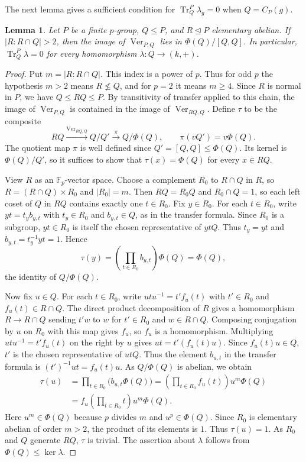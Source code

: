 \documentclass[11pt,a4paper]{article}
\newtheorem{lemma}[theorem]{Lemma}
\theoremstyle{definition}
\theoremstyle{remark}
\numberwithin{equation}{section}
\newcommand{\Fp}{\mathbb{F}_p}
\begin{document}
	The next lemma gives a sufficient condition for
	$\operatorname{Tr}_{Q}^P\lambda_g=0$ when $Q=C_P(g)$.
	
	\begin{lemma}\label{lem:elementary-transfer}
		Let $P$ be a finite $p$-group, $Q\le P$, and $R\unlhd P$ elementary abelian.
		If $|R:R\cap Q|>2$, then the image of $\operatorname{Ver}_{P,Q}$
		lies in $\Phi(Q)/[Q,Q]$. In particular, $\operatorname{Tr}_{Q}^P\lambda=0$
		for every homomorphism $\lambda:Q\to(k,+)$.
	\end{lemma}
	
	\begin{proof}
		Put $m=|R:R\cap Q|$. This index is a power of $p$. Thus for odd $p$
		the hypothesis $m>2$ means $R\nleq Q$, and for $p=2$ it means $m\ge4$.
		Since $R$ is normal in $P$, we have $Q\le RQ\le P$. By transitivity
		of transfer \cite[Theorem~10.8]{Isaacs2008} applied to this chain,
		the image of $\operatorname{Ver}_{P,Q}$ is contained in the image of
		$\operatorname{Ver}_{RQ,Q}$. Define $\tau$ to be the composite
		\[
		RQ\xrightarrow{\operatorname{Ver}_{RQ,Q}} Q/Q'
		\xrightarrow{\pi} Q/\Phi(Q),
		\qquad \pi(vQ')=v\Phi(Q).
		\]
		The quotient map $\pi$ is well defined since $Q'=[Q,Q]\le\Phi(Q)$.
		Its kernel is $\Phi(Q)/Q'$, so it suffices to show that
		$\tau(x)=\Phi(Q)$ for every $x\in RQ$.
		
		View $R$ as an $\Fp$-vector space. Choose a complement $R_0$ to $R\cap Q$
		in $R$, so $R=(R\cap Q)\times R_0$ and $|R_0|=m$.
		Then $RQ=R_0Q$ and $R_0\cap Q=1$, so each left coset of $Q$ in
		$RQ$ contains exactly one $t\in R_0$. Fix $y\in R_0$. For each $t\in R_0$,
		write $yt=t_y b_{y,t}$ with $t_y\in R_0$ and $b_{y,t}\in Q$, as in
		the transfer formula. Since $R_0$ is a subgroup, $yt\in R_0$ is itself
		the chosen representative of $ytQ$. Thus $t_y=yt$ and
		$b_{y,t}=t_y^{-1}yt=1$. Hence
		\[
		\tau(y)=\left(\prod_{t\in R_0}b_{y,t}\right)\Phi(Q)=\Phi(Q),
		\]
		the identity of $Q/\Phi(Q)$.
		
		Now fix $u\in Q$. For each $t\in R_0$, write $utu^{-1}=t'f_u(t)$ with
		$t'\in R_0$ and $f_u(t)\in R\cap Q$. The direct product decomposition
		of $R$ gives a homomorphism $R\to R\cap Q$ sending $t'w$ to $w$
		for $t'\in R_0$ and $w\in R\cap Q$. Composing conjugation by $u$ on
		$R_0$ with this map gives $f_u$, so $f_u$ is a homomorphism.
		Multiplying $utu^{-1}=t'f_u(t)$ on the right by $u$ gives $ut=t'(f_u(t)u)$.
		Since $f_u(t)u\in Q$, $t'$ is the chosen representative of $utQ$.
		Thus the element $b_{u,t}$ in the transfer formula is
		$(t')^{-1}ut=f_u(t)u$. As $Q/\Phi(Q)$ is abelian, we obtain
		\[
		\begin{aligned}
			\tau(u)&=\prod_{t\in R_0}\bigl(b_{u,t}\Phi(Q)\bigr)
			=\left(\prod_{t\in R_0} f_u(t)\right)u^m\Phi(Q)\\
			&=f_u\!\left(\prod_{t\in R_0}t\right)u^m\Phi(Q).
		\end{aligned}
		\]
		Here $u^m\in\Phi(Q)$ because $p$ divides $m$ and $u^p\in\Phi(Q)$.
		Since $R_0$ is elementary abelian of order $m>2$, the product of its elements is $1$.
		Thus $\tau(u)=1$. As $R_0$ and $Q$ generate $RQ$, $\tau$ is trivial.
		The assertion about $\lambda$ follows from $\Phi(Q)\leq\ker\lambda$.
	\end{proof}
	
\end{document}
